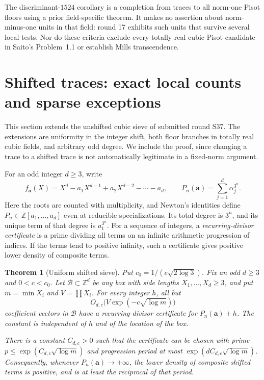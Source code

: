 \documentclass[11pt,a4paper]{article}
\newtheorem{theorem}{Theorem}[section]
\theoremstyle{remark}\newtheorem{remark}[theorem]{Remark}
\newcommand{\Z}{\mathbb Z}\newcommand{\Q}{\mathbb Q}
\begin{document}
The discriminant-$1524$ corollary is a completion from traces to
all norm-one Pisot floors using a prior field-specific theorem.
It makes no assertion about norm-minus-one units in that field:
round 17 exhibits such units that survive several local tests.
Nor do these criteria exclude every totally real cubic Pisot
candidate in Saito's Problem~1.1 or establish Mills transcendence.

\section{Shifted traces: exact local counts and sparse exceptions}\label{sec:density}
This section extends the unshifted cubic sieve of submitted round
S37. The extensions are uniformity in the integer shift, both floor
branches in totally real cubic fields, and arbitrary odd degree. We
include the proof, since changing a trace to a shifted trace is not
automatically legitimate in a fixed-norm argument.

For an odd integer $d\ge3$, write
\[
 f_{\mathbf a}(X)=X^d-a_1X^{d-1}+a_2X^{d-2}-\cdots-a_d,
 \qquad P_n(\mathbf a)=\sum_{j=1}^d\alpha_j^{3^n}.
\]
Here the roots are counted with multiplicity, and Newton's identities
define $P_n\in\Z[a_1,\ldots,a_d]$ even at reducible specializations.
Its total degree is $3^n$, and its unique term of that degree is
$a_1^{3^n}$. For a sequence of integers, a \emph{recurring-divisor
certificate} is a prime dividing all terms on an infinite arithmetic
progression of indices. If the terms tend to positive infinity, such
a certificate gives positive lower density of composite terms.

\begin{theorem}[Uniform shifted sieve]\label{thm:shiftedsieve}
Put $c_0=1/(e\sqrt{2\log3})$. Fix an odd $d\ge3$ and $0<c<c_0$.
Let $\mathcal B\subset\Z^d$ be any box with side lengths
$X_1,\ldots,X_d\ge3$, and put $m=\min X_i$ and $V=\prod X_i$.
For every integer $h$, all but
\begin{equation}\label{eq:exceptionbound}
 O_{d,c}\bigl(V\exp(-c\sqrt{\log m})\bigr)
\end{equation}
coefficient vectors in $\mathcal B$ have a recurring-divisor
certificate for $P_n(\mathbf a)+h$. The constant is independent of
$h$ and of the location of the box.

There is a constant $C_{d,c}>0$ such that the certificate can be
chosen with prime $p\le\exp(C_{d,c}\sqrt{\log m})$ and progression
period at most $\exp(dC_{d,c}\sqrt{\log m})$. Consequently, whenever
$P_n(\mathbf a)\to+\infty$, the lower density of composite shifted
terms is positive, and is at least the reciprocal of that period.
\end{theorem}
\end{document}
